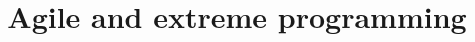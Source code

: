 \documentclass{beamer}
\title{Agile and extreme programming}
\begin{document}
    \begin{frame}

    \maketitle

    \end{frame}
    
    

    
\end{document}

